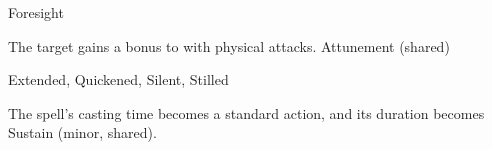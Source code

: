 \begin{spellsection}{Foresight}
\begin{spellheader}
\end{spellheader}
\begin{spellcontent}
\begin{spelltargetinginfo}
\end{spelltargetinginfo}
\begin{spelleffects}
\spelleffect
The target gains a  bonus to  with physical attacks.
\spelldur Attunement (shared)
\end{spelleffects}
\end{spellcontent}
\begin{spellfooter}
 Extended, Quickened, Silent, Stilled
\end{spellfooter}
\begin{spellsubcontent}
\begin{spellcantrip}
The spell's casting time becomes a standard action, and its duration becomes Sustain (minor, shared).
\end{spellcantrip}
\end{spellsubcontent}
\end{spellsection}
